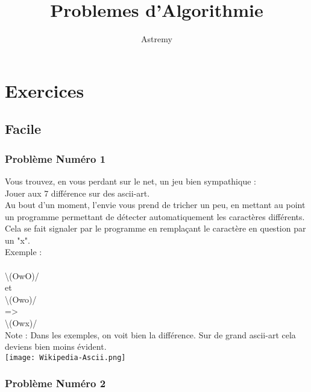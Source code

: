 \documentclass[12pt]{article}
\title{Problemes d'Algorithmie}
\author{Astremy}
\date{}
\begin{document}
\maketitle

\tableofcontents
\newpage


\section{Exercices}

\subsection{Facile}

\subsubsection{Problème Numéro 1}

Vous trouvez, en vous perdant sur le net, un jeu bien sympathique :\\
Jouer aux 7 différence sur des ascii-art.\\
Au bout d'un moment, l'envie vous prend de tricher un peu, en mettant au point un programme permettant de détecter automatiquement les caractères différents.\\
Cela se fait signaler par le programme en remplaçant le caractère en question par un "x".\\

Exemple :
\\\\
\textbackslash(OwO)/\\
et\\
\textbackslash(Owo)/\\
=\textgreater\\
\textbackslash(Owx)/\\

Note : Dans les exemples, on voit bien la différence. Sur de grand ascii-art cela deviens bien moins évident.\\

\texttt{[image: Wikipedia-Ascii.png]}

\subsubsection{Problème Numéro 2}
\end{document}
